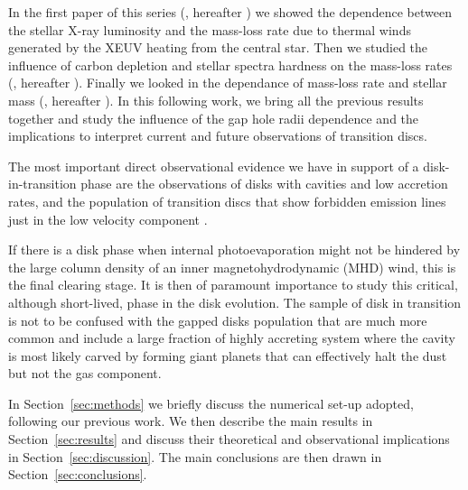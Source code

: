 In the first paper of this series (\cite{2019MNRAS.487..691P}, hereafter ) we showed the dependence between the stellar X-ray luminosity and the mass-loss rate due to thermal winds generated by the XEUV heating from the central star. Then we studied the influence of carbon depletion \citep{2019MNRAS.490.5596W} and stellar spectra hardness on the mass-loss rates (\cite{2021MNRAS.508.1675E}, hereafter ). Finally we looked in the dependance of mass-loss rate and stellar mass (\cite{2021MNRAS.508.3611P}, hereafter ). In this following work, we bring all the previous results together and study the influence of the gap hole radii dependence and the implications to interpret current and future observations of transition discs.

The most important direct observational evidence we have in support of a disk-in-transition phase are the observations of disks with cavities and low accretion rates, and the population of transition discs that show forbidden emission lines just in the low velocity component \citep{2020ApJ...903...78P}.

If there is a disk phase when internal photoevaporation might not be hindered by the large column density of an inner magnetohydrodynamic (MHD) wind, this is the final clearing stage. It is then of paramount importance to study this critical, although short-lived, phase in the disk evolution.
The sample of disk in transition is not to be confused with the gapped disks population that are much more common and include a large fraction of highly accreting system where the cavity is most likely carved by forming giant planets that can effectively halt the dust but not the gas component.

In Section~\ref{sec:methods} we briefly discuss the numerical set-up adopted, following our previous work. We then describe the main results in Section~\ref{sec:results} and discuss their theoretical and observational implications in Section~\ref{sec:discussion}. The main conclusions are then drawn in Section~\ref{sec:conclusions}.